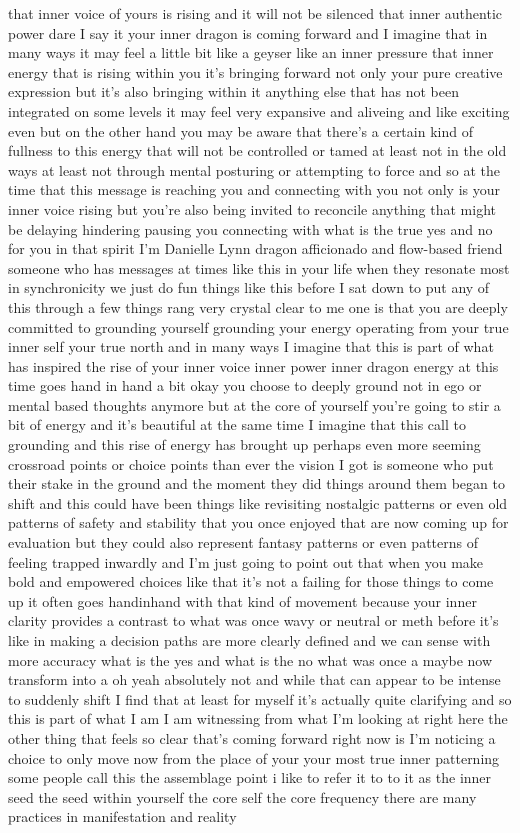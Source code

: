 \documentclass{article}
\begin{document}
that inner voice of yours is rising and it will not be silenced that inner authentic power dare I say it your inner dragon is coming forward and I imagine that in many ways it may feel a little bit like a geyser like an inner pressure that inner energy that is rising within you it's bringing forward not only your pure creative expression but it's also bringing within it anything else that has not been integrated on some levels it may feel very expansive and aliveing and like exciting even but on the other hand you may be aware that there's a certain kind of fullness to this energy that will not be controlled or tamed at least not in the old ways at least not through mental posturing or attempting to force and so at the time that this message is reaching you and connecting with you not only is your inner voice rising but you're also being invited to reconcile anything that might be delaying hindering pausing you connecting with what is the true yes and no for you in that spirit I'm Danielle Lynn dragon afficionado and flow-based friend someone who has messages at times like this in your life when they resonate most in synchronicity we just do fun things like this before I sat down to put any of this through a few things rang very crystal clear to me one is that you are deeply committed to grounding yourself grounding your energy operating from your true inner self your true north and in many ways I imagine that this is part of what has inspired the rise of your inner voice inner power inner dragon energy at this time goes hand in hand a bit okay you choose to deeply ground not in ego or mental based thoughts anymore but at the core of yourself you're going to stir a bit of energy and it's beautiful at the same time I imagine that this call to grounding and this rise of energy has brought up perhaps even more seeming crossroad points or choice points than ever the vision I got is someone who put their stake in the ground and the moment they did things around them began to shift and this could have been things like revisiting nostalgic patterns or even old patterns of safety and stability that you once enjoyed that are now coming up for evaluation but they could also represent fantasy patterns or even patterns of feeling trapped inwardly and I'm just going to point out that when you make bold and empowered choices like that it's not a failing for those things to come up it often goes handinhand with that kind of movement because your inner clarity provides a contrast to what was once wavy or neutral or meth before it's like in making a decision paths are more clearly defined and we can sense with more accuracy what is the yes and what is the no what was once a maybe now transform into a oh yeah absolutely not and while that can appear to be intense to suddenly shift I find that at least for myself it's actually quite clarifying and so this is part of what I am I am witnessing from what I'm looking at right here the other thing that feels so clear that's coming forward right now is I'm noticing a choice to only move now from the place of your your most true inner patterning some people call this the assemblage point i like to refer it to to it as the inner seed the seed within yourself the core self the core frequency there are many practices in manifestation and reality 
\end{document}
